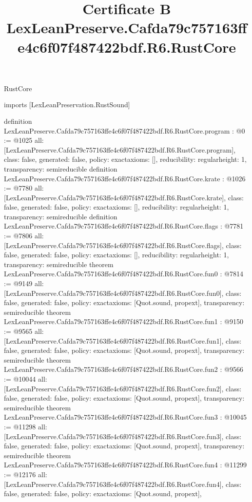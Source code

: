 \begin{lexlean}{RustCore}
\title{Certificate B LexLeanPreserve.Cafda79c757163ffe4c6f07f487422bdf.R6.RustCore}
\begin{coremodule}
imports [LexLeanPreservation.RustSound]

definition LexLeanPreserve.Cafda79c757163ffe4c6f07f487422bdf.R6.RustCore.program : @0 := @1025 {
  all: [LexLeanPreserve.Cafda79c757163ffe4c6f07f487422bdf.R6.RustCore.program],
  class: false,
  generated: false,
  policy: exact{axioms: []},
  reducibility: regular{height: 1},
  transparency: semireducible
}
definition LexLeanPreserve.Cafda79c757163ffe4c6f07f487422bdf.R6.RustCore.krate : @1026 := @7780 {
  all: [LexLeanPreserve.Cafda79c757163ffe4c6f07f487422bdf.R6.RustCore.krate],
  class: false,
  generated: false,
  policy: exact{axioms: []},
  reducibility: regular{height: 1},
  transparency: semireducible
}
definition LexLeanPreserve.Cafda79c757163ffe4c6f07f487422bdf.R6.RustCore.flags : @7781 := @7806 {
  all: [LexLeanPreserve.Cafda79c757163ffe4c6f07f487422bdf.R6.RustCore.flags],
  class: false,
  generated: false,
  policy: exact{axioms: []},
  reducibility: regular{height: 1},
  transparency: semireducible
}
theorem LexLeanPreserve.Cafda79c757163ffe4c6f07f487422bdf.R6.RustCore.fun0 : @7814 := @9149 {
  all: [LexLeanPreserve.Cafda79c757163ffe4c6f07f487422bdf.R6.RustCore.fun0],
  class: false,
  generated: false,
  policy: exact{axioms: [Quot.sound, propext]},
  transparency: semireducible
}
theorem LexLeanPreserve.Cafda79c757163ffe4c6f07f487422bdf.R6.RustCore.fun1 : @9150 := @9565 {
  all: [LexLeanPreserve.Cafda79c757163ffe4c6f07f487422bdf.R6.RustCore.fun1],
  class: false,
  generated: false,
  policy: exact{axioms: [Quot.sound, propext]},
  transparency: semireducible
}
theorem LexLeanPreserve.Cafda79c757163ffe4c6f07f487422bdf.R6.RustCore.fun2 : @9566 := @10044 {
  all: [LexLeanPreserve.Cafda79c757163ffe4c6f07f487422bdf.R6.RustCore.fun2],
  class: false,
  generated: false,
  policy: exact{axioms: [Quot.sound, propext]},
  transparency: semireducible
}
theorem LexLeanPreserve.Cafda79c757163ffe4c6f07f487422bdf.R6.RustCore.fun3 : @10045 := @11298 {
  all: [LexLeanPreserve.Cafda79c757163ffe4c6f07f487422bdf.R6.RustCore.fun3],
  class: false,
  generated: false,
  policy: exact{axioms: [Quot.sound, propext]},
  transparency: semireducible
}
theorem LexLeanPreserve.Cafda79c757163ffe4c6f07f487422bdf.R6.RustCore.fun4 : @11299 := @12176 {
  all: [LexLeanPreserve.Cafda79c757163ffe4c6f07f487422bdf.R6.RustCore.fun4],
  class: false,
  generated: false,
  policy: exact{axioms: [Quot.sound, propext]},
}
\end{coremodule}
\end{lexlean}
